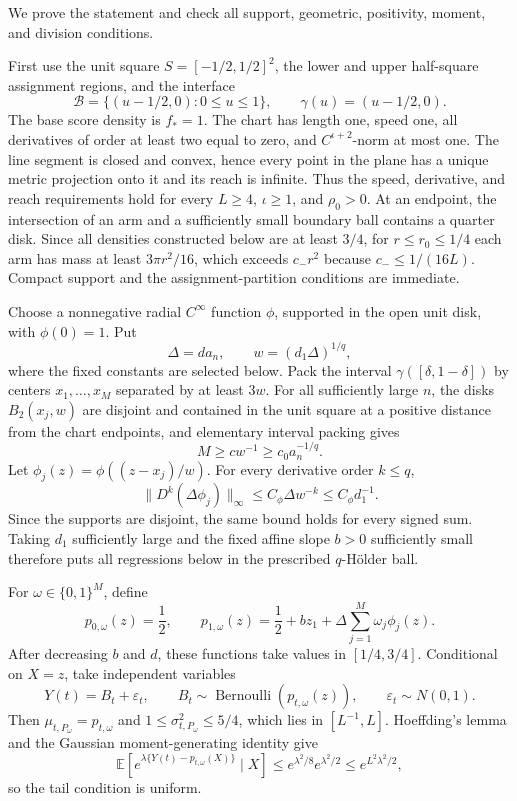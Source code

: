 We prove the statement and check all support, geometric, positivity, moment, and division conditions.

First use the unit square \(S=[-1/2,1/2]^2\), the lower and upper half-square assignment regions, and the interface
\[
\mathcal B=\{(u-1/2,0):0\leq u\leq1\},
\qquad \gamma(u)=(u-1/2,0).
\]
The base score density is \(f_*=1\).  The chart has length one, speed one, all derivatives of order at least two equal to zero, and \(C^{\iota+2}\)-norm at most one.  The line segment is closed and convex, hence every point in the plane has a unique metric projection onto it and its reach is infinite.  Thus the speed, derivative, and reach requirements hold for every \(L\geq4\), \(\iota\geq1\), and \(\rho_0>0\).  At an endpoint, the intersection of an arm and a sufficiently small boundary ball contains a quarter disk.  Since all densities constructed below are at least \(3/4\), for \(r\leq r_0\leq1/4\) each arm has mass at least \(3\pi r^2/16\), which exceeds \(c_-r^2\) because \(c_-\leq1/(16L)\).  Compact support and the assignment-partition conditions are immediate.

Choose a nonnegative radial \(C^\infty\) function \(\phi\), supported in the open unit disk, with \(\phi(0)=1\).  Put
\[
\Delta=d a_n,
\qquad
w=(d_1\Delta)^{1/q},
\]
where the fixed constants are selected below.  Pack the interval \(\gamma([\delta,1-\delta])\) by centers \(x_1,\ldots,x_M\) separated by at least \(3w\).  For all sufficiently large \(n\), the disks \(B_2(x_j,w)\) are disjoint and contained in the unit square at a positive distance from the chart endpoints, and elementary interval packing gives
\[
M\geq c w^{-1}\geq c_0a_n^{-1/q}.
\]
Let \(\phi_j(z)=\phi((z-x_j)/w)\).  For every derivative order \(k\leq q\),
\[
\lVert D^k(\Delta\phi_j)\rVert_\infty
\leq C_\phi\Delta w^{-k}
\leq C_\phi d_1^{-1}.
\]
Since the supports are disjoint, the same bound holds for every signed sum.  Taking \(d_1\) sufficiently large and the fixed affine slope \(b>0\) sufficiently small therefore puts all regressions below in the prescribed \(q\)-H\"older ball.

For \(\omega\in\{0,1\}^M\), define
\[
p_{0,\omega}(z)=\frac12,
\qquad
p_{1,\omega}(z)=\frac12+bz_1+\Delta\sum_{j=1}^M\omega_j\phi_j(z).
\]
After decreasing \(b\) and \(d\), these functions take values in \([1/4,3/4]\).  Conditional on \(X=z\), take independent variables
\[
Y(t)=B_t+\varepsilon_t,
\qquad
B_t\sim\operatorname{Bernoulli}(p_{t,\omega}(z)),
\qquad
\varepsilon_t\sim N(0,1).
\]
Then \(\mu_{t,P_\omega}=p_{t,\omega}\) and
\(1\leq\sigma^2_{t,P_\omega}\leq5/4\), which lies in \([L^{-1},L]\).  Hoeffding's lemma and the Gaussian moment-generating identity give
\[
\mathbb E\!\left[e^{\lambda\{Y(t)-p_{t,\omega}(X)\}}\mid X\right]
\leq e^{\lambda^2/8}e^{\lambda^2/2}
\leq e^{L^2\lambda^2/2},
\]
so the tail condition is uniform.

